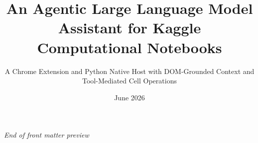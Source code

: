\documentclass[11pt,a4paper,oneside]{book} %
\title{An Agentic Large Language Model Assistant for Kaggle Computational Notebooks}
\subtitle{A Chrome Extension and Python Native Host with DOM-Grounded Context and Tool-Mediated Cell Operations}
\date{June 2026}
\numberwithin{equation}{section}
\begin{document}
\maketitle









\tableofcontents
\listoftables
\listoffigures


\newpage
\thispagestyle{empty}
\begin{center}
\vfill
{\large\textit{End of front matter preview}}
\vfill
\end{center}
\end{document}
